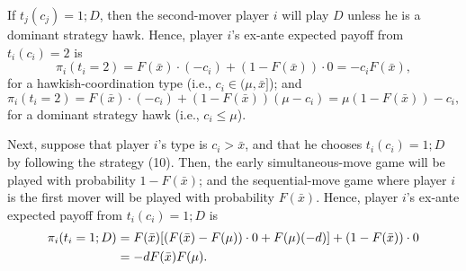 \documentclass[12pt,english]{article}
\begin{document}
If $t_j(c_j)=1; D$, then the second-mover player $i$ will play $D$ unless he is a dominant strategy hawk. Hence, player $i$'s ex-ante expected payoff from $t_i(c_i)=2$ is
\begin{equation}
\pi_i(t_i=2)=F(\bar{x})\cdot (-c_i)+(1-F(\bar{x})) \cdot 0=-c_iF(\bar{x}),
\end{equation}
for a hawkish-coordination type (i.e., $c_i \in (\mu, \bar{x}]$); and
\begin{equation}
\pi_i(t_i=2)=F(\bar{x})\cdot (-c_i)+(1-F(\bar{x})) (\mu-c_i)=\mu(1-F(\bar{x}))-c_i,
\end{equation}
for a dominant strategy hawk (i.e., $c_i \leq \mu$).\par
Next, suppose that player $i$'s type is $c_i > \bar{x}$, and that he chooses $t_i(c_i)=1; D$ by following the strategy (10). Then, the early simultaneous-move game will be played with probability $1-F(\bar{x})$; and the sequential-move game where player $i$ is the first mover will be played with probability $F(\bar{x})$. Hence, player $i$'s ex-ante expected payoff from $t_i(c_i)=1; D$ is
\begin{align}
\pi_i(t_i=1; D)&=F(\bar{x})[(F(\bar{x})-F(\mu)) \cdot 0 +F(\mu) (-d)] +(1-F(\bar{x})) \cdot 0\\
&=-dF(\bar{x})F(\mu).\notag
\end{align}\par
\end{document}
